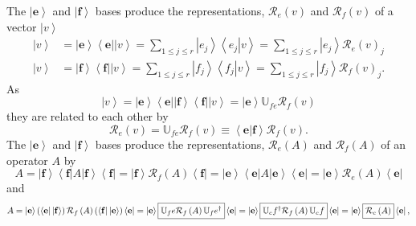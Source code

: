 \documentclass[aps,preprint]{revtex4}
\begin{document}
The $\left\vert \mathbf{e}\right\rangle $ and $\left\vert \mathbf{f}%
\right\rangle $ bases produce the representations, $\mathcal{R}_{e}\left(
v\right) $ and $\mathcal{R}_{f}\left( v\right) $ of a vector $\left\vert
v\right\rangle $ 
\begin{align}
\left\vert v\right\rangle & =\left\vert \mathbf{e}\right\rangle \left\langle 
\mathbf{e}\right\vert \left\vert v\right\rangle =\sum_{1\leq j\leq
r}\left\vert e_{j}\right\rangle \left\langle \left. e_{j}\right\vert
v\right\rangle =\sum_{1\leq j\leq r}\left\vert e_{j}\right\rangle \mathcal{R}%
_{e}\left( v\right) _{j} \\
\left\vert v\right\rangle & =\left\vert \mathbf{f}\right\rangle \left\langle 
\mathbf{f}\right\vert \left\vert v\right\rangle =\sum_{1\leq j\leq
r}\left\vert f_{j}\right\rangle \left\langle \left. f_{j}\right\vert
v\right\rangle =\sum_{1\leq j\leq r}\left\vert f_{j}\right\rangle \mathcal{R}%
_{f}\left( v\right) _{j}.
\end{align}%
As 
\begin{equation}
\left\vert v\right\rangle =\left\vert \mathbf{e}\right\rangle \left\langle 
\mathbf{e}\right\vert \left\vert \mathbf{f}\right\rangle \left\langle 
\mathbf{f}\right\vert \left\vert v\right\rangle =\left\vert \mathbf{e}%
\right\rangle \mathbb{U}_{fe}\mathcal{R}_{f}\left( v\right)
\end{equation}%
they are related to each other by 
\begin{equation}
\mathcal{R}_{e}\left( v\right) =\mathbb{U}_{fe}\mathcal{R}_{f}\left(
v\right) \equiv \left\langle \left. \mathbf{e}\right\vert \mathbf{f}%
\right\rangle \mathcal{R}_{f}\left( v\right) .
\end{equation}%
The $\left\vert \mathbf{e}\right\rangle $ and $\left\vert \mathbf{f}%
\right\rangle $ bases produce the representations, $\mathcal{R}_{e}\left(
A\right) $ and $\mathcal{R}_{f}\left( A\right) $ of an operator $A$ by 
\begin{equation}
A=\left\vert \mathbf{f}\right\rangle \left\langle \mathbf{f}\right\vert
A\left\vert \mathbf{f}\right\rangle \left\langle \mathbf{f}\right\vert
=\left\vert \mathbf{f}\right\rangle \mathcal{R}_{f}\left( A\right)
\left\langle \mathbf{f}\right\vert =\left\vert \mathbf{e}\right\rangle
\left\langle \mathbf{e}\right\vert A\left\vert \mathbf{e}\right\rangle
\left\langle \mathbf{e}\right\vert =\left\vert \mathbf{e}\right\rangle 
\mathcal{R}_{e}\left( A\right) \left\langle \mathbf{e}\right\vert
\end{equation}%
and%
\begin{equation}
A=\left\vert \mathbf{e}\right\rangle \left( \left\langle \mathbf{e}%
\right\vert \left\vert \mathbf{f}\right\rangle \right) \mathcal{R}_{f}\left(
A\right) \left( \left\langle \mathbf{f}\right\vert \left\vert \mathbf{e}%
\right\rangle \right) \left\langle \mathbf{e}\right\vert =\left\vert \mathbf{%
e}\right\rangle \fbox{$\mathbb{U}_{f}e\mathcal{R}_{f}\left( A\right) \mathbb{%
U}_{f}e^{\dagger }$}\left\langle \mathbf{e}\right\vert =\left\vert \mathbf{e}%
\right\rangle \fbox{$\mathbb{U}_{e}f^{\dagger }\mathcal{R}_{f}\left(
A\right) \mathbb{U}_{e}f$}\left\langle \mathbf{e}\right\vert =\left\vert 
\mathbf{e}\right\rangle \fbox{$\mathcal{R}_{e}\left( A\right) $}\left\langle 
\mathbf{e}\right\vert ,
\end{equation}%
\end{document}
